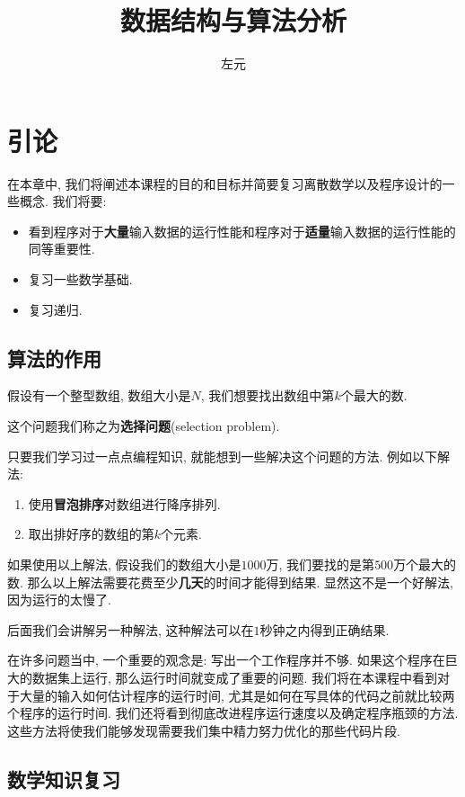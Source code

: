 \documentclass[oneside]{ctexbook}
\title{数据结构与算法分析}
\author{左元}
\begin{document}
\maketitle
\tableofcontents

\chapter{引论}

在本章中, 我们将阐述本课程的目的和目标并简要复习离散数学以及程序设计的一些概念. 我们将要:

\begin{itemize}
    \item 看到程序对于\textbf{大量}输入数据的运行性能和程序对于\textbf{适量}输入数据的运行性能的同等重要性.
    \item 复习一些数学基础.
    \item 复习递归.
\end{itemize}

\section{算法的作用}

假设有一个整型数组, 数组大小是$N$, 我们想要找出数组中第$k$个最大的数.

这个问题我们称之为\textbf{选择问题}(selection problem).

只要我们学习过一点点编程知识, 就能想到一些解决这个问题的方法. 例如以下解法:

\begin{enumerate}
    \item 使用\textbf{冒泡排序}对数组进行降序排列.
    \item 取出排好序的数组的第$k$个元素.
\end{enumerate}

如果使用以上解法, 假设我们的数组大小是$1000$万, 我们要找的是第$500$万个最大的数. 那么以上解法需要花费至少\textbf{几天}的时间才能得到结果. 显然这不是一个好解法, 因为运行的太慢了.

后面我们会讲解另一种解法, 这种解法可以在$1$秒钟之内得到正确结果.

在许多问题当中, 一个重要的观念是: 写出一个工作程序并不够. 如果这个程序在巨大的数据集上运行, 那么运行时间就变成了重要的问题. 我们将在本课程中看到对于大量的输入如何估计程序的运行时间, 尤其是如何在写具体的代码之前就比较两个程序的运行时间. 我们还将看到彻底改进程序运行速度以及确定程序瓶颈的方法. 这些方法将使我们能够发现需要我们集中精力努力优化的那些代码片段.

\section{数学知识复习}
\end{document}
